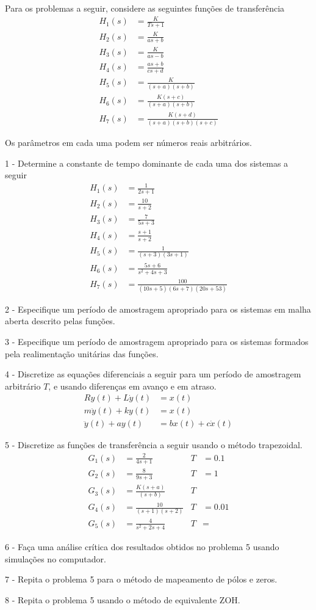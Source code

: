 \documentclass[12pt, a4paper]{article}
\title{}
\date{\today}
\begin{document}
\maketitle

Para os problemas a seguir, considere as seguintes funções de transferência 
\begin{align}
	H_1(s) &= \frac{K}{Ts+1}\\
	H_2(s) &= \frac{K}{as+b}\\
	H_3(s) &= \frac{K}{as-b}\\	
	H_4(s) &= \frac{as+b}{cs+d}\\
	H_5(s) &= \frac{K}{(s+a)(s+b)}\\
	H_6(s) &= \frac{K(s+c)}{(s+a)(s+b)}\\
	H_7(s) &= \frac{K(s+d)}{(s+a)(s+b)(s+c)}
\end{align}

Os parâmetros em cada uma podem ser números reais arbitrários.

1 - Determine a constante de tempo dominante de cada uma dos sistemas a seguir
\begin{align}
	H_1(s) &= \frac{1}{2s+1}\\
	H_2(s) &= \frac{10}{s+2}\\
	H_3(s) &= \frac{7}{5s+3}\\
	H_4(s) &= \frac{s+1}{s+2}\\
	H_5(s) &= \frac{1}{(s+3)(3s+1)}\\
	H_6(s) &= \frac{5s+6}{s^2+4s+3}\\
	H_7(s) &= \frac{100}{(10s+5)(6s+7)(20s+53)}
\end{align}

2 - Especifique um período de amostragem apropriado para os sistemas em malha aberta descrito pelas funções.

3 - Especifique um período de amostragem apropriado para os sistemas formados pela realimentação unitárias das funções.

4 - Discretize as equações diferenciais a seguir para um período de amostragem arbitrário $T$, e usando diferenças em avanço e em atraso. 
\begin{align}
	R y(t) + L \dot{y}(t) &= x(t)\\
	m \ddot{y}(t) + k y(t) &= x(t)\\
	\ddot{y}(t) + a y(t) &= bx(t) + c\dot{x}(t)
\end{align}

5 - Discretize as funções de transferência a seguir usando o método trapezoidal.
\begin{align}
	G_1(s) &= \frac{2}{4s+1} & T&=0.1\\
	G_2(s) &= \frac{8}{9s+3} & T&=1\\
	G_3(s) &= \frac{K(s+a)}{(s+b)} & T&\\
	G_4(s) &= \frac{10}{(s+1)(s+2)} & T&=0.01\\	
	G_5(s) &= \frac{4}{s^2+2s+4} & T&=
\end{align}

6 - Faça uma análise crítica dos resultados obtidos no problema 5 usando simulações no computador.

7 - Repita o problema 5 para o método de mapeamento de pólos e zeros. 

8 - Repita o problema 5 usando o método de equivalente ZOH. 
\end{document}
